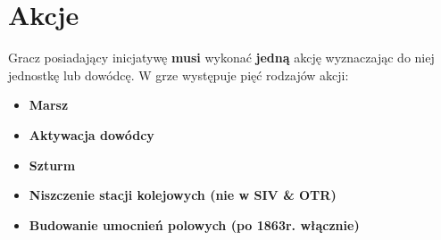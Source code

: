 


\section{Akcje}
Gracz posiadający inicjatywę \textbf{musi} wykonać \textbf{jedną} akcję wyznaczając do niej jednostkę lub dowódcę. W grze występuje pięć rodzajów akcji:
\begin{itemize}
  \item \textbf{Marsz}
  \item \textbf{Aktywacja dowódcy}
  \item \textbf{Szturm}
  \item \textbf{Niszczenie stacji kolejowych (nie w SIV \& OTR)}
  \item \textbf{Budowanie umocnień polowych (po 1863r. włącznie)}
\end{itemize}
